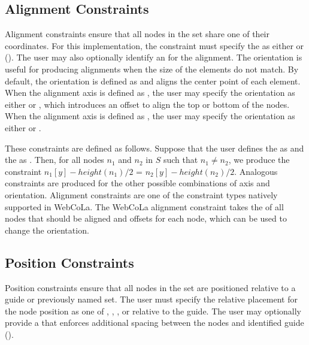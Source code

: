 \subsection{Alignment Constraints}
Alignment constraints ensure that all nodes in the set share one of their
coordinates. For this implementation, the constraint must specify the 
as either  or  ().
The user may also optionally identify an  for the alignment.
The orientation is useful for producing alignments when the size of the
elements do not match. By default, the orientation is defined as 
and aligns the center point of each element. When the alignment axis is defined as ,
the user may specify the orientation as either  or , which introduces
an offset to align the top or bottom of the nodes. When the alignment axis is 
defined as , the user may specify the orientation as either  or .

These constraints are defined as follows.  Suppose that
the user defines the 
as  and the  as .  Then, for all
nodes $n_1$ and $n_2$ in $S$
such that $n_1 \neq n_2$, we produce the constraint
$n_1[y] - height(n_1)/2$ = $n_2[y] - height(n_2)/2$.  Analogous constraints
are produced for the other possible combinations of axis and orientation.
Alignment constraints are one of the constraint types natively supported in
WebCoLa. The WebCoLa alignment constraint takes the  of all nodes
that should be aligned and offsets for each node, which can be used to change the orientation.

\subsection{Position Constraints}
Position constraints ensure that all nodes in the set are positioned relative to
a guide or previously named set. The user must specify the relative
placement for the node position as one of , , 
, or  relative to the guide.
The user may optionally provide a  that enforces additional spacing
between the nodes and identified guide ().

